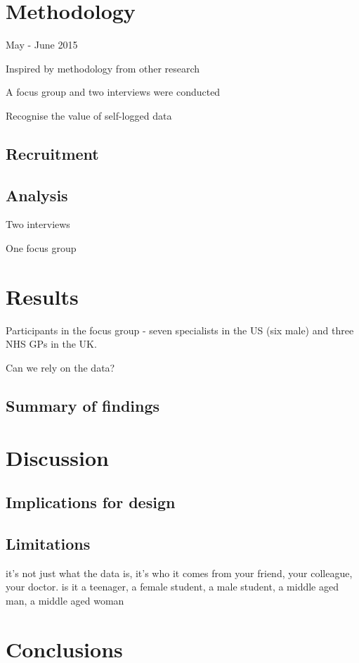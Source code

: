 \documentclass{sigchi}
\begin{document}
\section{Methodology}

May - June 2015

Inspired by methodology from other research

A focus group and two interviews were conducted

Recognise the value of self-logged data


\subsection{Recruitment}

\subsection{Analysis}

Two interviews

One focus group

\section{Results}

Participants in the focus group - seven specialists in the US (six male) and three NHS GPs in the UK.

Can we rely on the data?

\subsection{Summary of findings}

\section{Discussion}


\subsection{Implications for design}

\subsection{Limitations}

it's not just what the data is, it's who it comes from {your friend, your colleague, your doctor}. is it {a teenager, a female student, a male student, a middle aged man, a middle aged woman}


\section{Conclusions}




\end{document}
